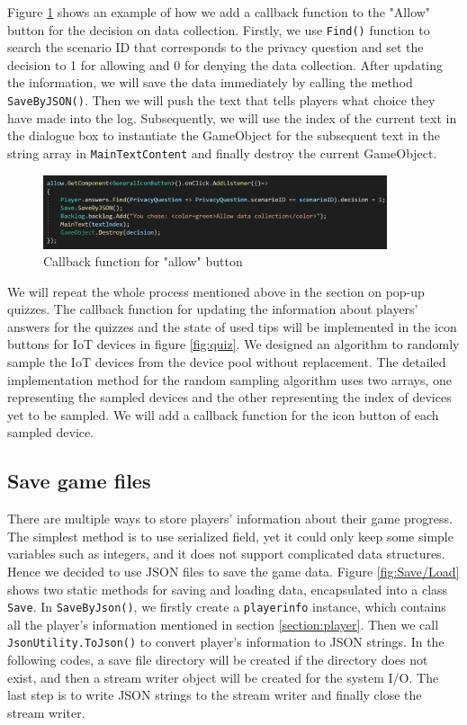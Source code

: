 \documentclass[msc,deptreport,ai]{infthesis}      %
\begin{document}
Figure \ref{fig:callback} shows an example of how we add a callback function to the "Allow" button for the decision on data collection. Firstly, we use \texttt{Find()} function to search the scenario ID that corresponds to the privacy question and set the decision to 1 for allowing and 0 for denying the data collection. After updating the information, we will save the data immediately by calling the method \texttt{SaveByJSON()}. Then we will push the text that tells players what choice they have made into the log. Subsequently, we will use the index of the current text in the dialogue box to instantiate the GameObject for the subsequent text in the string array in \texttt{MainTextContent} and finally destroy the current GameObject.

\begin{figure}[htbp]
    \centering
    \includegraphics[width=0.9\textwidth]{Listener.png}
    \caption{Callback function for "allow" button}
    \label{fig:callback}
\end{figure}

We will repeat the whole process mentioned above in the section on pop-up quizzes. The callback function for updating the information about players' answers for the quizzes and the state of used tips will be implemented in the icon buttons for IoT devices in figure \ref{fig:quiz}. We designed an algorithm to randomly sample the IoT devices from the device pool without replacement. The detailed implementation method for the random sampling algorithm uses two arrays, one representing the sampled devices and the other representing the index of devices yet to be sampled. We will add a callback function for the icon button of each sampled device.

\subsection{Save game files}

There are multiple ways to store players' information about their game progress. The simplest method is to use serialized field, yet it could only keep some simple variables such as integers, and it does not support complicated data structures. Hence we decided to use JSON files to save the game data. Figure \ref{fig:Save/Load} shows two static methods for saving and loading data, encapsulated into a class \texttt{Save}. In \texttt{SaveByJson()}, we firstly create a \texttt{playerinfo} instance, which contains all the player's information mentioned in section \ref{section:player}. Then we call \texttt{JsonUtility.ToJson()} to convert player's information to JSON strings. In the following codes, a save file directory will be created if the directory does not exist, and then a stream writer object will be created for the system I/O. The last step is to write JSON strings to the stream writer and finally close the stream writer.
\end{document}

